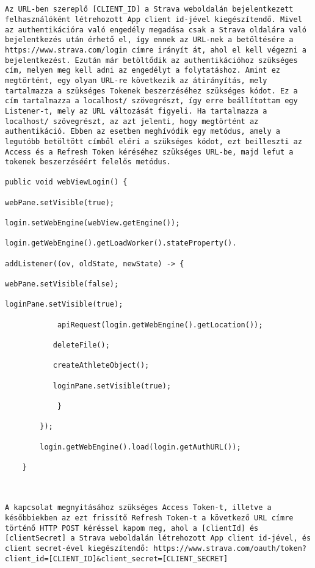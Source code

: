 \begin{verbatim}


Az URL-ben szereplő [CLIENT_ID] a Strava weboldalán bejelentkezett felhasználóként létrehozott App client id-jével kiegészítendő. Mivel az authentikációra való engedély megadása csak a Strava oldalára való bejelentkezés után érhető el, így ennek az URL-nek a betöltésére a https://www.strava.com/login címre irányít át, ahol el kell végezni a bejelentkezést. Ezután már betöltődik az authentikációhoz szükséges cím, melyen meg kell adni az engedélyt a folytatáshoz. Amint ez megtörtént, egy olyan URL-re következik az átirányítás, mely tartalmazza a szükséges Tokenek beszerzéséhez szükséges kódot. Ez a cím tartalmazza a localhost/ szövegrészt, így erre beállítottam egy Listener-t, mely az URL változását figyeli. Ha tartalmazza a localhost/ szövegrészt, az azt jelenti, hogy megtörtént az authentikáció. Ebben az esetben meghívódik egy metódus, amely a legutóbb betöltött címből eléri a szükséges kódot, ezt beilleszti az Access és a Refresh Token kéréséhez szükséges URL-be, majd lefut a tokenek beszerzéséért felelős metódus. 

public void webViewLogin() { 

webPane.setVisible(true); 

login.setWebEngine(webView.getEngine()); 

login.getWebEngine().getLoadWorker().stateProperty(). 

addListener((ov, oldState, newState) -> { 

webPane.setVisible(false); 

loginPane.setVisible(true); 

          	apiRequest(login.getWebEngine().getLocation()); 

           deleteFile(); 

           createAthleteObject(); 

           loginPane.setVisible(true); 

            } 

        }); 

        login.getWebEngine().load(login.getAuthURL()); 

    } 

 

A kapcsolat megnyitásához szükséges Access Token-t, illetve a későbbiekben az ezt frissítő Refresh Token-t a következő URL címre történő HTTP POST kéréssel kapom meg, ahol a [clientId] és [clientSecret] a Strava weboldalán létrehozott App client id-jével, és client secret-ével kiegészítendő: https://www.strava.com/oauth/token?client_id=[CLIENT_ID]&client_secret=[CLIENT_SECRET] 


\end{verbatim}
